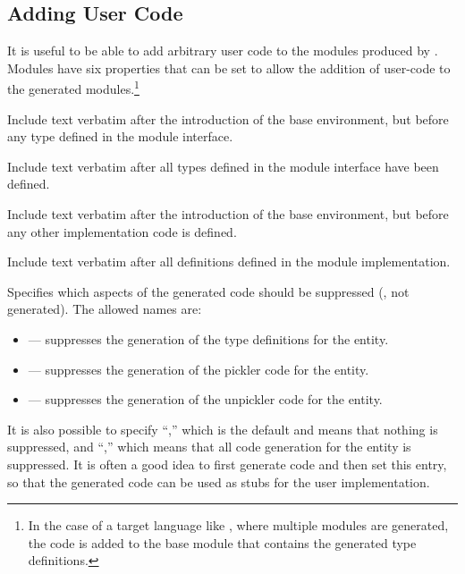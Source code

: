 \subsection{Adding User Code}
It is useful to be able to add arbitrary user code to the modules
produced by \asdlgen{}.
Modules have six properties that can be set to allow
the addition of user-code to the generated modules.\footnote{
  In the case of a target language like \sml{}, where multiple modules
  are generated, the code is added to the base module that contains the
  generated type definitions.
}
\begin{description}
    Include text verbatim after the introduction of the base
    environment, but before any type defined in the module interface.

    Include text verbatim after all types defined in the module
    interface have been defined.

    Include text verbatim after the introduction of the base
    environment, but before any other implementation code is defined.

    Include text verbatim after all definitions defined in the module
    implementation.


    Specifies which aspects of the generated code should be suppressed (\ie{},
    not generated).  The allowed names are:
    \begin{itemize}
      \item {} --- suppresses the generation of the type definitions for the entity.
      \item {} --- suppresses the generation of the pickler code for the entity.
      \item {} --- suppresses the generation of the unpickler code for the entity.
    \end{itemize}%
    It is also possible to specify ``,'' which is the default and means
    that nothing is suppressed, and ``,'' which means that all code generation
    for the entity is suppressed.
    It is often a good idea to first generate code and then
    set this entry, so that the generated code can be used as stubs for the
    user implementation.


\end{description}
